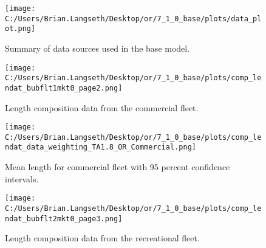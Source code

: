\documentclass[11pt,
  english,
  a4paper,
]{article}
\begin{document}
\tagmcend\tagstructend


\begin{figure}
\centering
\texttt{[image: C:/Users/Brian.Langseth/Desktop/or/7\_1\_0\_base/plots/data\_plot.png]}
\caption{Summary of data sources used in the base model.\label{fig:data-plot}}
\end{figure}

\tagmcend\tagstructend


\begin{figure}
\centering
\texttt{[image: C:/Users/Brian.Langseth/Desktop/or/7\_1\_0\_base/plots/comp\_lendat\_bubflt1mkt0\_page2.png]}
\caption{Length composition data from the commercial fleet.\label{fig:com-len-data}}
\end{figure}

\tagmcend\tagstructend


\begin{figure}
\centering
\texttt{[image: C:/Users/Brian.Langseth/Desktop/or/7\_1\_0\_base/plots/comp\_lendat\_data\_weighting\_TA1.8\_OR\_Commercial.png]}
\caption{Mean length for commercial fleet with 95 percent confidence intervals.\label{fig:mean-com-len-data}}
\end{figure}

\tagmcend\tagstructend


\begin{figure}
\centering
\texttt{[image: C:/Users/Brian.Langseth/Desktop/or/7\_1\_0\_base/plots/comp\_lendat\_bubflt2mkt0\_page3.png]}
\caption{Length composition data from the recreational fleet.\label{fig:rec-len-data}}
\end{figure}

\tagmcend\tagstructend

\end{document}
